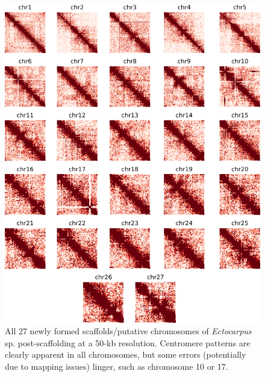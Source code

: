 \begin{suppsection}
\begin{figure}[ht]
\centering
    \includegraphics[width=13.5cm]{fig/instagraal/s11.png}
    \caption{All 27 newly formed scaffolds/putative chromosomes of \textit{Ectocarpus} sp. post-scaffolding at a 50-kb resolution. Centromere patterns are clearly apparent in all chromosomes, but some errors (potentially due to mapping issues) linger, such as chromosome 10 or 17.}
    \label{fig:instagraal_s11}
\end{figure}

\end{suppsection}